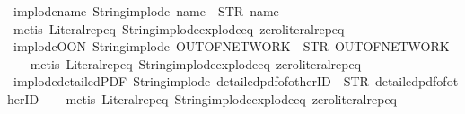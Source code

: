 \begin{isabellebody}
\endisatagproof
{\isafoldproof}%
%
\isadelimproof
\isanewline
%
\endisadelimproof
\isanewline
{}\isamarkupfalse%
\ implode{\isacharunderscore}name{\isacharcolon}\ {\isachardoublequoteopen}String{\isachardot}implode\ {\isacharprime}{\isacharprime}name{\isacharprime}{\isacharprime}\ {\isacharequal}\ STR\ {\isacharprime}{\isacharprime}name{\isacharprime}{\isacharprime}{\isachardoublequoteclose}\isanewline
%
\isadelimproof
\ \ %
\endisadelimproof
%
\isatagproof
{}\isamarkupfalse%
\ {\isacharparenleft}metis\ Literal{\isachardot}rep{\isacharunderscore}eq\ String{\isachardot}implode{\isacharunderscore}explode{\isacharunderscore}eq\ zero{\isacharunderscore}literal{\isachardot}rep{\isacharunderscore}eq{\isacharparenright}%
\endisatagproof
{\isafoldproof}%
%
\isadelimproof
\isanewline
%
\endisadelimproof
\isanewline
{}\isamarkupfalse%
\ implode{\isacharunderscore}OON{\isacharcolon}\ {\isachardoublequoteopen}String{\isachardot}implode\ {\isacharprime}{\isacharprime}OUT{\isacharunderscore}OF{\isacharunderscore}NETWORK{\isacharprime}{\isacharprime}\ {\isacharequal}\ STR\ {\isacharprime}{\isacharprime}OUT{\isacharunderscore}OF{\isacharunderscore}NETWORK{\isacharprime}{\isacharprime}{\isachardoublequoteclose}\isanewline
%
\isadelimproof
\ \ %
\endisadelimproof
%
\isatagproof
{}\isamarkupfalse%
\ {\isacharparenleft}metis\ Literal{\isachardot}rep{\isacharunderscore}eq\ String{\isachardot}implode{\isacharunderscore}explode{\isacharunderscore}eq\ zero{\isacharunderscore}literal{\isachardot}rep{\isacharunderscore}eq{\isacharparenright}%
\endisatagproof
{\isafoldproof}%
%
\isadelimproof
\isanewline
%
\endisadelimproof
\isanewline
{}\isamarkupfalse%
\ implode{\isacharunderscore}detailedPDF{\isacharcolon}\ {\isachardoublequoteopen}String{\isachardot}implode\ {\isacharprime}{\isacharprime}detailed{\isacharunderscore}pdf{\isacharunderscore}of{\isacharunderscore}otherID{\isacharprime}{\isacharprime}\ {\isacharequal}\ STR\ {\isacharprime}{\isacharprime}detailed{\isacharunderscore}pdf{\isacharunderscore}of{\isacharunderscore}otherID{\isacharprime}{\isacharprime}{\isachardoublequoteclose}\isanewline
%
\isadelimproof
\ \ %
\endisadelimproof
%
\isatagproof
{}\isamarkupfalse%
\ {\isacharparenleft}metis\ Literal{\isachardot}rep{\isacharunderscore}eq\ String{\isachardot}implode{\isacharunderscore}explode{\isacharunderscore}eq\ zero{\isacharunderscore}literal{\isachardot}rep{\isacharunderscore}eq{\isacharparenright}%
\endisatagproof
{\isafoldproof}%
%
\isadelimproof
\isanewline
%
\endisadelimproof
\isanewline

\end{isabellebody}
